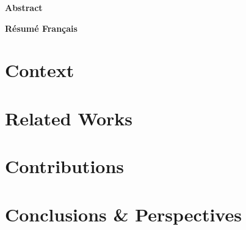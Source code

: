 \documentclass{book}
\newenvironment{abstract}%
{\cleardoublepage\null \vfill\begin{center}%
\Huge \bfseries Abstract \end{center}}%
{\vfill\null}
\newenvironment{abstractfr}%
{\cleardoublepage\null \vfill\begin{center}%
\Huge \bfseries R\'esum\'e Fran\c{c}ais \end{center}}%
{\vfill\null}
\begin{document}
   \makeflyleaf

   \begin{abstract}
   
   \end{abstract}

   \begin{abstractfr}
   
   \end{abstractfr}

   \tableofcontents

   \part{Context}
   
   
   
   

   \part{Related Works}
   

   \part{Contributions}
   
   
   

   \part{Conclusions \& Perspectives}
   
   

   \appendix
   


\end{document}
